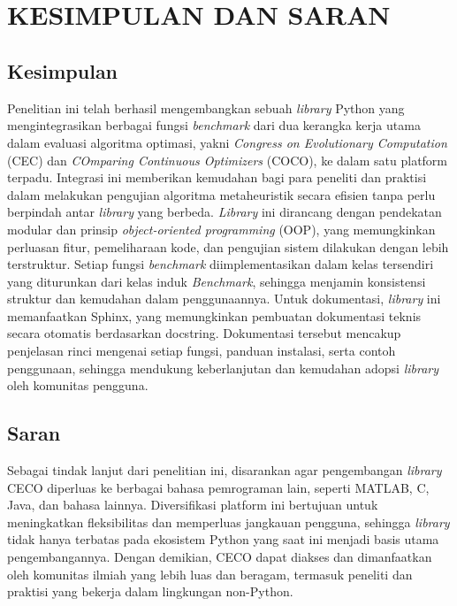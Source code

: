 
\chapter[KESIMPULAN DAN SARAN]{\\ KESIMPULAN DAN SARAN}

\section{Kesimpulan}
Penelitian ini telah berhasil mengembangkan sebuah \textit{library} Python yang mengintegrasikan berbagai fungsi \textit{benchmark} dari dua kerangka kerja utama dalam evaluasi algoritma optimasi, yakni \textit{Congress on Evolutionary Computation} (CEC) dan \textit{COmparing Continuous Optimizers} (COCO), ke dalam satu platform terpadu. Integrasi ini memberikan kemudahan bagi para peneliti dan praktisi dalam melakukan pengujian algoritma metaheuristik secara efisien tanpa perlu berpindah antar \textit{library} yang berbeda. \textit{Library} ini dirancang dengan pendekatan modular dan prinsip \textit{object-oriented programming} (OOP), yang memungkinkan perluasan fitur, pemeliharaan kode, dan pengujian sistem dilakukan dengan lebih terstruktur. Setiap fungsi \textit{benchmark} diimplementasikan dalam kelas tersendiri yang diturunkan dari kelas induk \textit{Benchmark}, sehingga menjamin konsistensi struktur dan kemudahan dalam penggunaannya. Untuk dokumentasi, \textit{library} ini memanfaatkan Sphinx, yang memungkinkan pembuatan dokumentasi teknis secara otomatis berdasarkan docstring. Dokumentasi tersebut mencakup penjelasan rinci mengenai setiap fungsi, panduan instalasi, serta contoh penggunaan, sehingga mendukung keberlanjutan dan kemudahan adopsi \textit{library} oleh komunitas pengguna.

\section{Saran}
Sebagai tindak lanjut dari penelitian ini, disarankan agar pengembangan \textit{library} CECO diperluas ke berbagai bahasa pemrograman lain, seperti MATLAB, C, Java, dan bahasa lainnya. Diversifikasi platform ini bertujuan untuk meningkatkan fleksibilitas dan memperluas jangkauan pengguna, sehingga \textit{library} tidak hanya terbatas pada ekosistem Python yang saat ini menjadi basis utama pengembangannya. Dengan demikian, CECO dapat diakses dan dimanfaatkan oleh komunitas ilmiah yang lebih luas dan beragam, termasuk peneliti dan praktisi yang bekerja dalam lingkungan non-Python.

